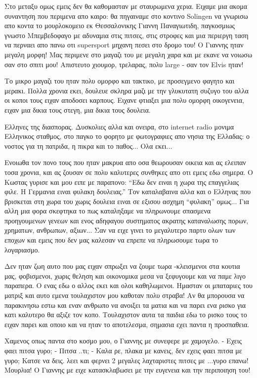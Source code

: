 Στο μεταξυ ομως εμεις δεν θα καθομασταν με σταυρωμενα χερια. 
Ειχαμε μια ακομα συναντηση που περιμενα απο καιρο: θα πηγαιναμε στο κοντινο Solingen να γνωρισω απο κοντα το μουρλοκομειο εκ Θεσσαλονικης Γιαννη Παναγιωτιδη, παγκοσμιως γνωστο Μπεμβεδοφαγο με αδυναμια στις πιτσες, στις στροφες και μια περιεργη ταση να περναει απο πανω οτι supersport μηχανη πεσει στο δρομο του! 
Ο Γιαννης ηταν μεγαλη μορφη! Μας περιμενε στο μαγαζι του με μεγαλη χαρα και με εκανε να νοιωσω σαν στο σπιτι μου! Απιστευτο χιουμορ, τρελαρας, πολυ large - σαν τον Elvis ηταν!  

Το μικρο μαγαζι του ηταν πολυ ομορφο και τακτικο, με προσεγμενο φαγητο και μερακι. Πολλα χρονια εκει, δουλευε σκληρα μαζι με την γλυκυτατη συζυγο του αλλα οι κοποι τους ειχαν αποδοσει καρπους. Ειχανε φτιαξει μια πολυ ομορφη οικογενεια, ειχαν μια δικια τους στεγη, μια δικια τους δουλεια. 


Ελληνες της διασπορας. Δυσκολιες αλλα και ονειρα, στο internet radio μονιμα Ελληνικος σταθμος, στο παγκο το φορητο με φωτογραφιες απο νησια της Ελλαδας: ο νοστος για τη πατριδα, η πικρα και το παθος... Ολα εκει...

Ενοιωθα τον πονο τους που ηταν μακρυα απο οσα θεωρουσαν οικεια και ας ελειπαν τοσα χρονια, και ας ζουσαν σε πολυ καλυτερες συνθηκες απο οτι εμεις εδω σημερα. 
Ο Κωστας γυρισε και μου ειπε με παραπονο: ``Εδω δεν ειναι η χωρα της επαγγελιας φιλε. Η Γερμανια ειναι φυλακη δουλειας.''
Τον καταλαβαινα αλλα και ο Ελληνας που βρισκεται στη χωρα του χωρις δουλεια ειναι σε εξισου ασχημη ``φυλακη'' ομως... 
Για αλλη μια φορα σκεφτηκα το πως καταληξαμε να πληρωνουμε σπασμενα προηγουμενων γενεων και ενος αδηφαγου συστηματος ακρατης καταναλωσης πορων, χρηματων, ανθρωπων, αξιων... Σαν να ειχε γινει το μεγαλυτερο παρτυ ολων των εποχων και εμεις που δεν μας καλεσαν να επρεπε να πληρωσουμε τωρα το λογαριασμο.

Δεν ηταν ζωη αυτο που μας ειχαν σπρωξει να ζουμε τωρα -κλεισμενοι στα κουτια μας, φοβισμενοι, χωρις θεληση και οικονομικα μεσα να ξεφυγουμε και να παμε λιγο παραπερα. Ο ενας εδω ο αλλος εκει και ολοι καθηλωμενοι. Ημασταν οι μπαταριες του ματριξ και αυτο εμενα τουλαχιστον μου καθοταν πολυ στραβα! Αν θα μπορουσα να παρακινησω εστω και εναν ανθρωπο να ανοιξει τα ματια και να παρει ενα ρισκο για κατι καλυτερο θα αξιζε τον κοπο.
Τουλαχιστον αυτα τα παιδια εδω το ρισκο τους το ειχαν παρει και οποιο και να ηταν το αποτελεσμα, σημασια εχει παντα η προσπαθεια.

Χαμενος οπως παντα στο κοσμο μου, ο Γιαννης με συνεφερε με χαμογελο. 
- Εχεις φαει πιτσα γυρο;
- Πιτσα ..τι;
- Καλα ρε, πλακα με κανεις, δεν εχεις φαει πιτσα με γυρο; Κατσε να δεις. λεει και φερνει 2 μεγαλες λαχταριστες πιτσες με ...γυρο επανω! Μουρλια! Ο Γιαννης με ειχε κατασκλαβωσει με την ευγενεια και την περιποιηση του!

